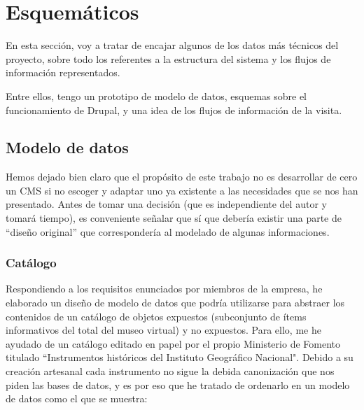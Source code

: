 \section{Esquemáticos}
\par En esta sección, voy a tratar de encajar algunos de los datos más técnicos del proyecto, sobre todo los referentes a la estructura del sistema y los flujos de información representados.
\par Entre ellos, tengo un prototipo de modelo de datos, esquemas sobre el funcionamiento de Drupal, y una idea de los flujos de información de la visita.

\subsection{Modelo de datos}
\par Hemos dejado bien claro que el propósito de este trabajo no es desarrollar de cero un CMS si no escoger y adaptar uno ya existente a las necesidades que se nos han presentado. Antes de tomar una decisión (que es independiente del autor y tomará tiempo), es conveniente señalar que sí que debería existir una parte de ``diseño original'' que correspondería al modelado de algunas informaciones.


\subsubsection{Catálogo}
\par Respondiendo a los requisitos enunciados por miembros de la empresa, he elaborado un diseño de modelo de datos que podría utilizarse para abstraer los contenidos de un catálogo de objetos expuestos (subconjunto de ítems informativos del total del museo virtual) y no expuestos.
Para ello, me he ayudado de un catálogo editado en papel por el propio Ministerio de Fomento titulado ``Instrumentos históricos del Instituto Geográfico Nacional". Debido a su creación artesanal cada instrumento no sigue la debida canonización que nos piden las bases de datos, y es por eso que he tratado de ordenarlo en un modelo de datos como el que se muestra:

